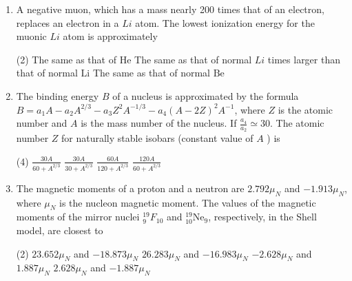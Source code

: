 \begin{enumerate}
	\item A negative muon, which has a mass nearly 200 times that of an electron, replaces an electron in a $L i$ atom. The lowest ionization energy for the muonic $L i$ atom is approximately
	{	}
	\begin{tasks}(2)
		\task[\textbf{A.}] The same as that of $\mathrm{He}$
		\task[\textbf{B.}] The same as that of normal $L i$
		 times larger than that of normal $\mathrm{Li}$
		\task[\textbf{D.}]  The same as that of normal $\mathrm{Be}$
	\end{tasks}
	\item The binding energy $B$ of a nucleus is approximated by the formula $B=a_{1} A-a_{2} A^{2 / 3}-a_{3} Z^{2} A^{-1 / 3}-a_{4}(A-2 Z)^{2} A^{-1}$, where $Z$ is the atomic number and $A$ is the mass number of the nucleus. If $\frac{a_{4}}{a_{2}} \simeq 30$. The atomic number $Z$ for naturally stable isobars (constant value of $A$ ) is
	{	}
	\begin{tasks}(4)
		\task[\textbf{A.}]  $\frac{30 A}{60+A^{2 / 3}}$
		\task[\textbf{B.}] $\frac{30 A}{30+A^{2 / 3}}$
		\task[\textbf{C.}]  $\frac{60 A}{120+A^{2 / 3}}$
		\task[\textbf{D.}] $\frac{120 A}{60+A^{2 / 3}}$
	\end{tasks}
	\item The magnetic moments of a proton and a neutron are $2.792 \mu_{N}$ and $-1.913 \mu_{N}$, where $\mu_{N}$ is the nucleon magnetic moment. The values of the magnetic moments of the mirror nuclei ${ }_{9}^{19} F_{10}$ and ${ }_{10}^{19} \mathrm{Ne}_{9}$, respectively, in the Shell model, are closest to
	{	}
	\begin{tasks}(2)
		\task[\textbf{A.}] $23.652 \mu_{N}$ and $-18.873 \mu_{N}$
		\task[\textbf{B.}] $26.283 \mu_{N}$ and $-16.983 \mu_{N}$
		\task[\textbf{C.}] $-2.628 \mu_{N}$ and $1.887 \mu_{N}$
		\task[\textbf{D.}] $2.628 \mu_{N}$ and $-1.887 \mu_{N}$
	\end{tasks}
\end{enumerate}
\setlength\arrayrulewidth{1pt}
